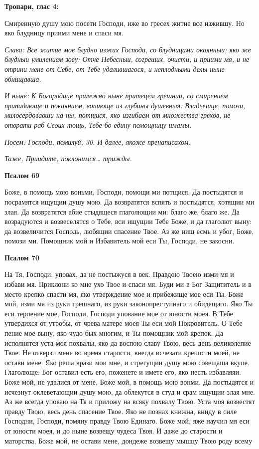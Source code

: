  

\bfseries Тропари, глас 4:\normalfont{}


   Смиренную душу мою посети Господи, иже во гресех житие все изжившу.
Но яко блудницу приими мене и спаси мя.


 \itshape Слава:\normalfont{} Все житие мое блудно изжих Господи, со блудницами окаянныи;
яко же блудныи умилением зову: Отче Небесныи, согреших, очисти, и
приими мя, и не отрини мене от Себе, от Тебе удалившагося, и неплодными
делы ныне обнищавша.


 \itshape И ныне:\normalfont{} К Богородице прилежно ныне притецем грешнии, со смирением
припадающе и покаянием, вопиюще из глубины душевныя: Владычице,
помози, милосердовавши на ны, потщися, яко изгибаем от множества грехов,
не отврати раб Своих тощь, Тебе бо едину помощницу имамы.


 \itshape Посем:\normalfont{} Господи, помилуй, \itshape 30. И далее, якоже пренаписахом.\normalfont{}


 \itshape Таже,\normalfont{} Приидите, поклонимся… \itshape трижды\normalfont{}.



 

\bfseries Псалом 69\normalfont{}


   Боже, в помощь мою воньми, Господи, помощи ми потщися. Да
постыдятся и посрамятся ищущии душу мою. Да возвратятся вспять и
постыдятся, хотящии ми злая. Да возвратятся абие стыдящеся глаголющии
ми: благо же, благо же. Да возрадуются и возвеселятся о Тебе, вси ищущии
Тебе Боже, и да глаголют выну: да возвеличится Господь, любящии спасение
Твое. Аз же нищ есмь и убог, Боже, помози ми. Помощник мой и Избавитель
мой еси Ты, Господи, не закосни.



 

\bfseries Псалом 70\normalfont{}


   На Тя, Господи, уповах, да не постыжуся в век. Правдою Твоею
изми мя и избави мя. Приклони ко мне ухо Твое и спаси мя. Буди
ми в Бог Защититель и в место крепко спасти мя, яко утверждение
мое и прибежище мое еси Ты. Боже мой, изми мя из руки грешнаго,
из руки законопреступнаго и обидящаго. Яко Ты еси терпение мое,
Господи, Господи упование мое от юности моея. В Тебе утвердихся
от утробы, от чрева матере моея Ты еси мой Покровитель. О Тебе
пение мое выну, яко чудо бых многим, и Ты помощник мой крепок.
Да исполнятся уста моя похвалы, яко да воспою славу Твою, весь
день великолепие Твое. Не отверзи мене во время старости, внегда
исчезати крепости моей, не остави мене. Яко реша врази мои мне,
и стрегущии душу мою совещаша вкупе. Глаголюще: Бог оставил
есть его, поженете и имете его, яко несть избавляяи. Боже мой, не
удалися от мене, Боже мой, в помощь мою вонми. Да постыдятся
и исчезнут оклеветающии душу мою, да облекутся в студ и срам
ищущии злая мне. Аз же всегда уповаю на Тя и приложу на всяку
похвалу Твою. Уста моя возвестят правду Твою, весь день спасение
Твое. Яко не познах книжна, вниду в силе Господни, Господи, помяну
правду Твою Единаго. Боже мой, яже научил мя еси от юности моея,
и до ныне возвещу чудеса Твоя. И даже до старости и маторства,
Боже мой, не остави мене, дондеже возвещу мышцу Твою роду всему

